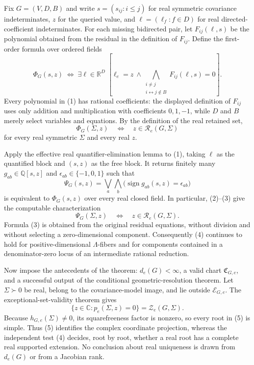 Fix \(G=(V,D,B)\) and write \(s=(s_{ij}:i\leq j)\) for real symmetric covariance indeterminates, \(z\) for the queried value, and \(\ell=(\ell_f:f\in D)\) for real directed-coefficient indeterminates.  For each missing bidirected pair, let \(F_{ij}(\ell,s)\) be the polynomial obtained from the residual in the definition of \(F_{ij}\).  Define the first-order formula over ordered fields
\[
 \Phi_G(s,z)\;\Longleftrightarrow\;
 \exists \ell\in\mathbb R^D\;
 \left[
   \ell_e=z
   \ \wedge\!
   \bigwedge_{\substack{i\ne j\\ i\leftrightarrow j\notin B}}
       F_{ij}(\ell,s)=0
 \right].                                                     \tag{1}
\]
Every polynomial in (1) has rational coefficients: the displayed definition of \(F_{ij}\) uses only addition and multiplication with coefficients \(0,1,-1\), while \(D\) and \(B\) merely select variables and equations.  By the definition of the real retained set,
\[
 \Phi_G(\Sigma,z)
 \quad\Longleftrightarrow\quad
 z\in\mathcal R_e(G,\Sigma)                                  \tag{2}
\]
for every real symmetric \(\Sigma\) and every real \(z\).

Apply the effective real quantifier-elimination lemma to (1), taking \(\ell\) as the quantified block and \((s,z)\) as the free block.  It returns finitely many \(g_{ab}\in\mathbb Q[s,z]\) and \(\epsilon_{ab}\in\{-1,0,1\}\) such that
\[
 \Psi_G(s,z)
 =\bigvee_a\bigwedge_b
   \bigl(\operatorname{sign}g_{ab}(s,z)=\epsilon_{ab}\bigr)   \tag{3}
\]
is equivalent to \(\Phi_G(s,z)\) over every real closed field.  In particular, (2)--(3) give the computable characterization
\[
 \Psi_G(\Sigma,z)
 \quad\Longleftrightarrow\quad
 z\in\mathcal R_e(G,\Sigma).                                  \tag{4}
\]
Formula (3) is obtained from the original residual equations, without division and without selecting a zero-dimensional component.  Consequently (4) continues to hold for positive-dimensional \(\Lambda\)-fibers and for components contained in a denominator-zero locus of an intermediate rational reduction.

Now impose the antecedents of the theorem: \(d_e(G)<\infty\), a valid chart \(\mathfrak C_{G,e}\), and a successful output of the conditional geometric-resolution theorem.  Let \(\Sigma\succ0\) be real, belong to the covariance-model image, and lie outside \(\mathcal E_{G,e}\).  The exceptional-set-validity theorem gives
\[
 \{z\in\mathbb C:p_e(\Sigma,z)=0\}
   =\mathcal Z_e(G,\Sigma).                                    \tag{5}
\]
Because \(h_{G,e}(\Sigma)\ne0\), its squarefreeness factor is nonzero, so every root in (5) is simple.  Thus (5) identifies the complex coordinate projection, whereas the independent test (4) decides, root by root, whether a real root has a complete real supported extension.  No conclusion about real uniqueness is drawn from \(d_e(G)\) or from a Jacobian rank.

